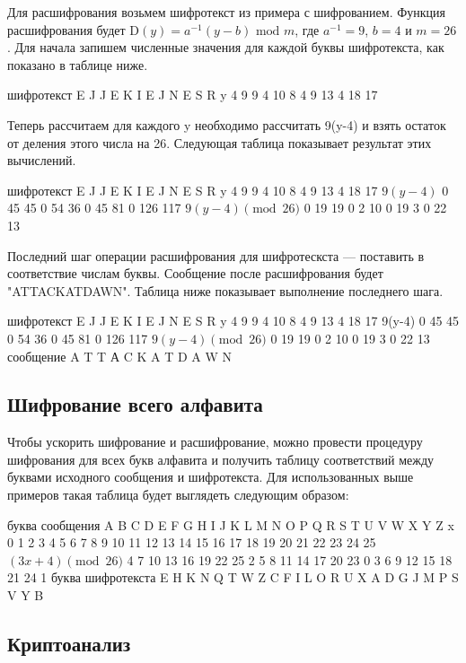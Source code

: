 Для расшифрования возьмем шифротекст из примера с шифрованием. Функция 
расшифрования будет $\mbox{D}(y)=a^{-1}(y-b)\mbox{ mod }m$, где $a^{-1}=9$, 
$b=4$ и $m=26$. Для начала запишем численные значения для каждой буквы 
шифротекста, как показано в таблице ниже.

шифротекст 	E 	J 	J 	E 	K 	I 	E 	J 	N 	E 	S 	R
y 	4 	9 	9 	4 	10 	8 	4 	9 	13 	4 	18 	17

Теперь рассчитаем для каждого y необходимо рассчитать 9(y-4) и взять 
остаток от деления этого числа на 26. Следующая таблица показывает 
результат этих вычислений.

шифротекст 	E 	J 	J 	E 	K 	I 	E 	J 	N 	E 	S 	R
y 	4 	9 	9 	4 	10 	8 	4 	9 	13 	4 	18 	17
$9(y-4)$ 	0 	45 	45 	0 	54 	36 	0 	45 	81 	0 	126 	117
$9(y-4)\pmod{26}$ 	0 	19 	19 	0 	2 	10 	0 	19 	3 	0 	22 	13

Последний шаг операции расшифрования для шифротескста — поставить в 
соответствие числам буквы. Сообщение после расшифрования будет 
"ATTACKATDAWN". Таблица ниже показывает выполнение последнего шага.

шифротекст 	E 	J 	J 	E 	K 	I 	E 	J 	N 	E 	S 	R
y 	4 	9 	9 	4 	10 	8 	4 	9 	13 	4 	18 	17
9(y-4) 	0 	45 	45 	0 	54 	36 	0 	45 	81 	0 	126 	117
$9(y-4)\pmod{26}$ 	0 	19 	19 	0 	2 	10 	0 	19 	3 	0 	22 	13
сообщение 	A 	T 	T 	А 	C 	K 	A 	T 	D 	A 	W 	N


\subsection{Шифрование всего алфавита}

Чтобы ускорить шифрование и расшифрование, можно провести процедуру 
шифрования для всех букв алфавита и получить таблицу соответствий 
между буквами исходного сообщения и шифротекста. Для использованных 
выше примеров такая таблица будет выглядеть следующим образом:

буква сообщения 	A 	B 	C 	D 	E 	F 	G 	H 	I 	J 	K 	L 	M 	N 	O 	P 	Q 	R 	S 	T 	U 	V 	W 	X 	Y 	Z
x 	0 	1 	2 	3 	4 	5 	6 	7 	8 	9 	10 	11 	12 	13 	14 	15 	16 	17 	18 	19 	20 	21 	22 	23 	24 	25
$(3x+4)\pmod{26}$ 	4 	7 	10 	13 	16 	19 	22 	25 	2 	5 	8 	11 	14 	17 	20 	23 	0 	3 	6 	9 	12 	15 	18 	21 	24 	1
буква шифротекста 	E 	H 	K 	N 	Q 	T 	W 	Z 	C 	F 	I 	L 	O 	R 	U 	X 	A 	D 	G 	J 	M 	P 	S 	V 	Y 	B


\subsection{Криптоанализ}

